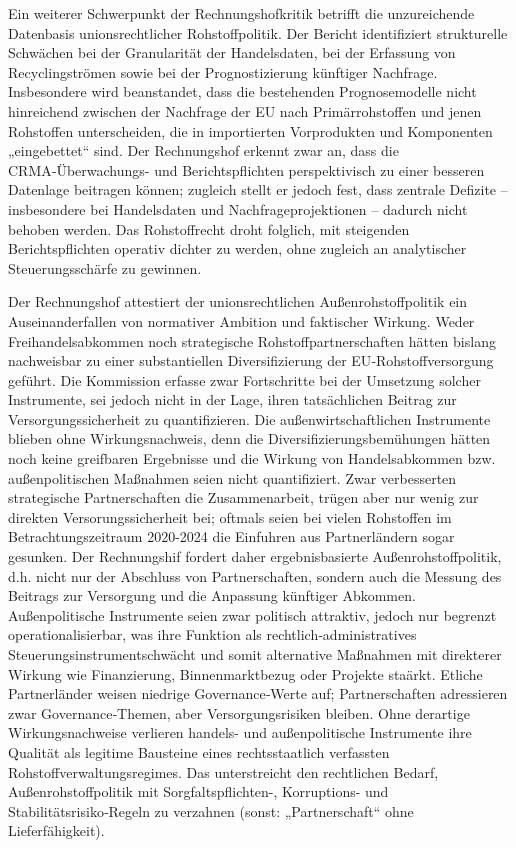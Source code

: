 \documentclass[12pt,a4paper,oneside]{book} %
\begin{document}
Ein weiterer Schwerpunkt der Rechnungshofkritik betrifft die unzureichende Datenbasis unionsrechtlicher Rohstoffpolitik. Der Bericht identifiziert strukturelle Schwächen bei der Granularität der Handelsdaten, bei der Erfassung von Recyclingströmen sowie bei der Prognostizierung künftiger Nachfrage. Insbesondere wird beanstandet, dass die bestehenden Prognosemodelle nicht hinreichend zwischen der Nachfrage der EU nach Primärrohstoffen und jenen Rohstoffen unterscheiden, die in importierten Vorprodukten und Komponenten „eingebettet“ sind. Der Rechnungshof erkennt zwar an, dass die CRMA‑Überwachungs- und Berichtspflichten perspektivisch zu einer besseren Datenlage beitragen können; zugleich stellt er jedoch fest, dass zentrale Defizite – insbesondere bei Handelsdaten und Nachfrageprojektionen – dadurch nicht behoben werden.  Das Rohstoffrecht droht folglich, mit steigenden Berichtspflichten operativ dichter zu werden, ohne zugleich an analytischer Steuerungsschärfe zu gewinnen.

Der Rechnungshof attestiert der unionsrechtlichen Außenrohstoffpolitik ein Auseinanderfallen von normativer Ambition und faktischer Wirkung. Weder Freihandelsabkommen noch strategische Rohstoffpartnerschaften hätten bislang nachweisbar zu einer substantiellen Diversifizierung der EU‑Rohstoffversorgung geführt. Die Kommission erfasse zwar Fortschritte bei der Umsetzung solcher Instrumente, sei jedoch nicht in der Lage, ihren tatsächlichen Beitrag zur Versorgungssicherheit zu quantifizieren. Die außenwirtschaftlichen Instrumente blieben ohne Wirkungsnachweis, denn die Diversifizierungsbemühungen hätten noch keine greifbaren Ergebnisse und die Wirkung von Handelsabkommen bzw. außenpolitischen Maßnahmen seien nicht quantifiziert. Zwar verbesserten strategische Partnerschaften die Zusammenarbeit, trügen aber nur wenig zur direkten Versorungssicherheit bei; oftmals seien bei vielen Rohstoffen im Betrachtungszeitraum 2020-2024 die Einfuhren aus Partnerländern sogar gesunken. Der Rechnungshif fordert daher ergebnisbasierte Außenrohstoffpolitik, d.h. nicht nur der Abschluss von Partnerschaften, sondern auch die Messung des Beitrags zur Versorgung und die Anpassung künftiger Abkommen. Außenpolitische Instrumente seien zwar politisch attraktiv, jedoch nur begrenzt operationalisierbar, was ihre Funktion als rechtlich‑administratives Steuerungsinstrumentschwächt und somit alternative Maßnahmen mit direkterer Wirkung wie Finanzierung, Binnenmarktbezug oder Projekte staärkt. Etliche Partnerländer weisen niedrige Governance‑Werte auf; Partnerschaften adressieren zwar Governance‑Themen, aber Versorgungsrisiken bleiben.  Ohne derartige Wirkungsnachweise verlieren handels- und außenpolitische Instrumente ihre Qualität als legitime Bausteine eines rechtsstaatlich verfassten Rohstoffverwaltungsregimes. Das unterstreicht den rechtlichen Bedarf, Außenrohstoffpolitik mit Sorgfaltspflichten-, Korruptions- und Stabilitätsrisiko‑Regeln zu verzahnen (sonst: „Partnerschaft“ ohne Lieferfähigkeit).
\end{document}
